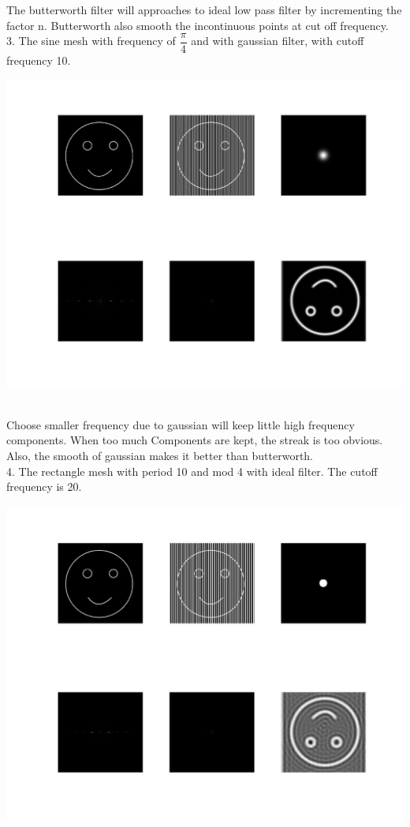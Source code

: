 \documentclass[a4paper]{article}
\begin{document}
The butterworth filter will approaches to ideal low pass filter by incrementing the factor n. Butterworth also 
smooth the incontinuous points at cut off frequency.\\
3. The sine mesh with frequency of $\dfrac{\pi}{4}$ and with gaussian filter, with cutoff frequency 10.\\
\centerline{\includegraphics[scale=0.30]{3.jpg}}\\
Choose smaller frequency due to gaussian will keep little high frequency components. When too much Components are kept,
the streak is too obvious. Also, the smooth of gaussian makes it better than butterworth.\\
4. The rectangle mesh with period 10 and mod 4 with ideal filter. The cutoff frequency is 20.\\
\centerline{\includegraphics[scale=0.30]{4.jpg}}\\
\end{document}
